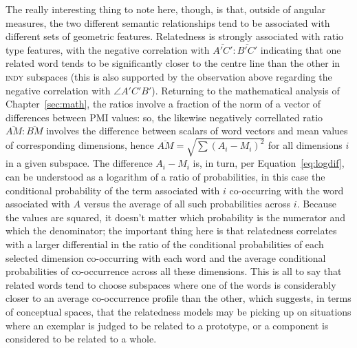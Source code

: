 The really interesting thing to note here, though, is that, outside of angular measures, the two different semantic relationships tend to be associated with different sets of geometric features.  Relatedness is strongly associated with ratio type features, with the negative correlation with $\overline{A'C'}:\overline{B'C'}$ indicating that one related word tends to be significantly closer to the centre line than the other in \textsc{indy} subspaces (this is also supported by the observation above regarding the negative correlation with $\angle A'C'B'$).  Returning to the mathematical analysis of Chapter~\ref{sec:math}, the ratios involve a fraction of the norm of a vector of differences between PMI values: so, the likewise negatively correllated ratio $\overline{AM}:\overline{BM}$ involves the difference between scalars of word vectors and mean values of corresponding dimensions, hence $\overline{AM} = \sqrt{\sum(A_{i}-M_{i})^2}$ for all dimensions $i$ in a given subspace.  The difference $A_{i}-M_{i}$ is, in turn, per Equation~\ref{eq:logdif}, can be understood as a logarithm of a ratio of probabilities, in this case the conditional probability of the term associated with $i$ co-occurring with the word associated with $A$ versus the average of all such probabilities across $i$.  Because the values are squared, it doesn't matter which probability is the numerator and which the denominator; the important thing here is that relatedness correlates with a larger differential in the ratio of the conditional probabilities of each selected dimension co-occurring with each word and the average conditional probabilities of co-occurrence across all these dimensions.  This is all to say that related words tend to choose subspaces where one of the words is considerably closer to an average co-occurrence profile than the other, which suggests, in terms of conceptual spaces, that the relatedness models may be picking up on situations where an exemplar is judged to be related to a prototype, or a component is considered to be related to a whole.


